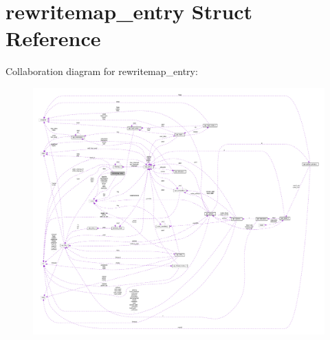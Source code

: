 \hypertarget{structrewritemap__entry}{}\section{rewritemap\+\_\+entry Struct Reference}
\label{structrewritemap__entry}


Collaboration diagram for rewritemap\+\_\+entry\+:
\nopagebreak
\begin{figure}[H]
\begin{center}
\leavevmode
\includegraphics[width=350pt]{structrewritemap__entry__coll__graph}
\end{center}
\end{figure}
